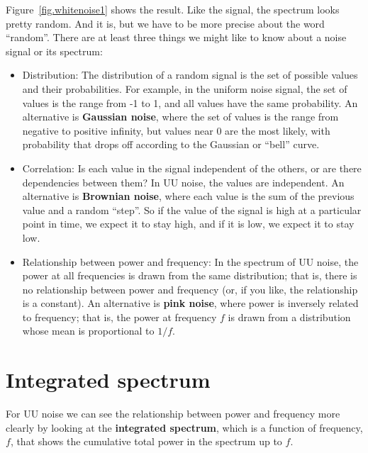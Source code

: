 \documentclass[12pt]{book}
\begin{document}
Figure~\ref{fig.whitenoise1} shows the result.  Like the signal, the
spectrum looks pretty random.  And it is, but we have to be more
precise about the word ``random''.  There are at least three things we
might like to know about a noise signal or its spectrum:

\begin{itemize}

\item Distribution: The distribution of a random signal is the set of
  possible values and their probabilities.  For example, in the
  uniform noise signal, the set of values is the range from -1 to 1,
  and all values have the same probability.  An alternative is
  {\bf Gaussian noise}, where the set of values is the range from negative
  to positive infinity, but values near 0 are the most likely, with
  probability that drops off according to the Gaussian or
  ``bell'' curve.

\item Correlation: Is each value in the signal independent of the
  others, or are there dependencies between them?  In UU noise, the
  values are independent.
  An alternative is {\bf Brownian noise}, where each value is the sum
  of the previous value and a random ``step''.  So if the value of the
  signal is high at a particular point in time, we expect it to stay
  high, and if it is low, we expect
  it to stay low.

\item Relationship between power and frequency: In the spectrum of UU
  noise, the power at all frequencies is drawn from the same
  distribution; that is, there is no relationship between power and
  frequency (or, if you like, the relationship is a constant).  An
  alternative is {\bf pink noise}, where power is inversely related
  to frequency; that is, the power at frequency $f$ is drawn from
  a distribution whose mean is proportional to $1/f$.

\end{itemize}


\section{Integrated spectrum}

For UU noise we can see the relationship between power and frequency
more clearly by looking at the {\bf integrated spectrum}, which
is a function of frequency, $f$, that shows the cumulative total power in
the spectrum up to $f$.
\end{document}
